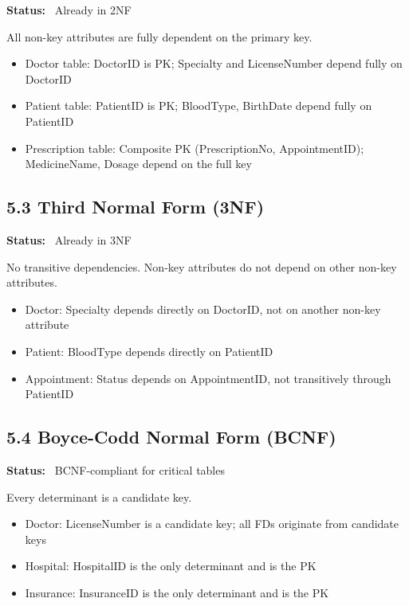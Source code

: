 \textbf{Status:} \checkmark~Already in 2NF

All non-key attributes are fully dependent on the primary key.

\begin{itemize}
    \item Doctor table: DoctorID is PK; Specialty and LicenseNumber depend fully on DoctorID
    \item Patient table: PatientID is PK; BloodType, BirthDate depend fully on PatientID
    \item Prescription table: Composite PK (PrescriptionNo, AppointmentID); MedicineName, Dosage depend on the full key
\end{itemize}

\subsection*{5.3 Third Normal Form (3NF)}

\textbf{Status:} \checkmark~Already in 3NF

No transitive dependencies. Non-key attributes do not depend on other non-key attributes.

\begin{itemize}
    \item Doctor: Specialty depends directly on DoctorID, not on another non-key attribute
    \item Patient: BloodType depends directly on PatientID
    \item Appointment: Status depends on AppointmentID, not transitively through PatientID
\end{itemize}

\subsection*{5.4 Boyce-Codd Normal Form (BCNF)}

\textbf{Status:} \checkmark~BCNF-compliant for critical tables

Every determinant is a candidate key.

\begin{itemize}
    \item Doctor: LicenseNumber is a candidate key; all FDs originate from candidate keys
    \item Hospital: HospitalID is the only determinant and is the PK
    \item Insurance: InsuranceID is the only determinant and is the PK
\end{itemize}

